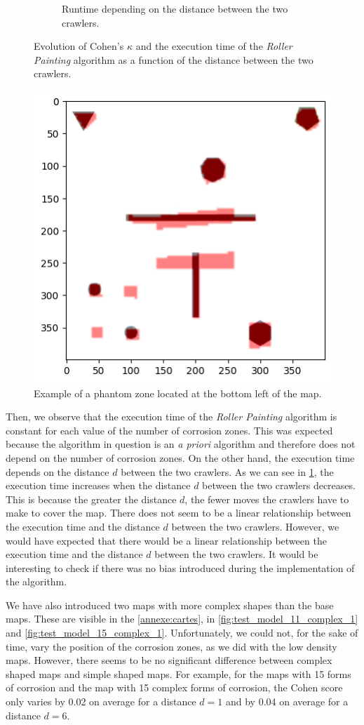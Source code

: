 \begin{figure}[h!]
\begin{subfigure}[t]{0.49\linewidth}
			\caption{Runtime depending on the distance between the two crawlers.}
			\label{fig:peinture_au_rouleau-time_vs_distance}
	\end{subfigure}
	\caption{Evolution of Cohen's $\kappa$ and the execution time of the \textit{Roller Painting} algorithm as a function of the distance between the two crawlers.}
	\label{fig:peinture_au_rouleau-distance}
\end{figure}

\begin{figure}[h!]
	\centering
	\includegraphics[width=0.5\linewidth]{graphics/output.png}
	\caption{Example of a phantom zone located at the bottom left of the map.}
	\label{fig:ghost_zone}
\end{figure}

Then, we observe that the execution time of the \textit{Roller Painting} algorithm is constant for each value of the number of corrosion zones.
This was expected because the algorithm in question is an \textit{a priori} algorithm and therefore does not depend on the number of corrosion zones.
On the other hand, the execution time depends on the distance $d$ between the two crawlers.
As we can see in \ref{fig:peinture_au_rouleau-time_vs_distance}, the execution time increases when the distance $d$ between the two crawlers decreases.
This is because the greater the distance $d$, the fewer moves the crawlers have to make to cover the map.
There does not seem to be a linear relationship between the execution time and the distance $d$ between the two crawlers.
However, we would have expected that there would be a linear relationship between the execution time and the distance $d$ between the two crawlers.
It would be interesting to check if there was no bias introduced during the implementation of the algorithm.

We have also introduced two maps with more complex shapes than the base maps.
These are visible in the \ref{annexe:cartes}, in \ref{fig:test_model_11_complex_1} and \ref{fig:test_model_15_complex_1}.
Unfortunately, we could not, for the sake of time, vary the position of the corrosion zones, as we did with the low density maps.
However, there seems to be no significant difference between complex shaped maps and simple shaped maps.
For example, for the maps with 15 forms of corrosion and the map with 15 complex forms of corrosion, the Cohen score only varies by 0.02 on average for a distance $d = 1$ and by 0.04 on average for a distance $d = 6$.


